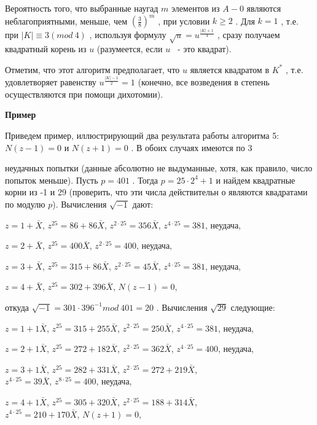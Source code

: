 \documentclass{mai_book}
\begin{document}
Вероятность того, что выбранные наугад $m$
 элементов из $A - {0}$
 являются неблагоприятными, меньше, чем $(\frac 38)^m$
 , при условии $k\geqslant 2$
. Для $k = 1$
, т.е. при $|K|\equiv 3 (mod \ 4)$
, используя формулу $\sqrt u = u^{\frac{|K|+1}{4}}$
, сразу получаем квадратный корень из $u$
 (разумеется, если $u$
 ~- это квадрат).

Отметим, что этот алгоритм предполагает, что $u$
 является квадратом в $K^*$
 , т.е. удовлетворяет равенству $u^{\frac{|K|-1}{2}} = 1$
 (конечно, все возведения в степень осуществляются при помощи дихотомии).


{\bf Пример}

Приведем пример, иллюстрирующий два результата работы алгоритма 5: $N(z-1)=0$ и $N(z+1)=0$
. В обоих случаях имеются по 3

\newpage

неудачных попытки (данные абсолютно не выдуманные, хотя, как правило, число попыток меньше). Пусть $p = 401$
. Тогда $p = 25\cdot 2^4 +1$
 и найдем квадратные корни из -1 и 29 (проверить, что эти числа действительн о являются квадратами по модулю $p$). Вычисления $\sqrt{-1}$
 дают:

\begin{center}
$z = 1 +\bar X$, $z^{25}=86+86\bar X$, $z^{2\cdot 25}=356\bar X$,
$z^{4\cdot 25}=381$, неудача,

$z = 2+\bar X$, $z^{25}=400\bar X$, $z^{2\cdot 25}=400$, неудача,

$z = 3+\bar X$, $z^{25}=315+86\bar X$, $z^{2\cdot 25}=45\bar X$, $z^{4\cdot 25}=381$, неудача,

$z=4+\bar X$, $z^{25}=302+396\bar X$, $N(z-1)=0$,
\end{center}


откуда $\sqrt{-1} = 301\cdot 396^{-1} mod \ 401 = 20 $
. Вычисления $\sqrt{29}$
 следующие:

\begin{center}

$z = 1 +1\bar X$, $z^{25}=315+255\bar X$, $z^{2\cdot 25}=250\bar X$,
$z^{4\cdot 25}=381$, неудача,

$z = 2+1\bar X$, $z^{25}=272+182\bar X$, $z^{2\cdot 25}=362\bar X$, $z^{4\cdot 25}=400$, неудача,

$z = 3+1\bar X$, $z^{25}=282+331\bar X$, $z^{2\cdot 25}=272+219\bar X$,\\ $z^{4\cdot 25}=39\bar X$, $z^{8\cdot 25}=400$, неудача,

$z=4+1\bar X$, $z^{25}=305+320\bar X$, $z^{2\cdot 25}=188+314\bar X$,\\ $z^{4\cdot 25}=210+170\bar X$, $N(z+1)=0$,

\end{center}
\end{document}
